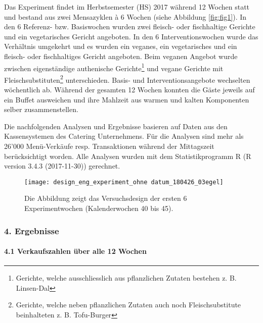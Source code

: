 \documentclass[12pt,ngerman,]{article}
\let\oldparagraph\paragraph
\renewcommand{\paragraph}[1]{\oldparagraph{#1}\mbox{}}
\let\rmarkdownfootnote\footnote%
\def\footnote{\protect\rmarkdownfootnote}
\begin{document}
\par

Das Experiment findet im Herbstsemester (HS) 2017 während 12 Wochen
statt und bestand aus zwei Mensazyklen à 6 Wochen (siehe Abbildung
\ref{fig:fig1}). In den 6 Referenz- bzw. Basiswochen wurden zwei
fleisch- oder fischhaltige Gerichte und ein vegetarisches Gericht
angeboten. In den 6 Interventionswochen wurde das Verhältnis umgekehrt
und es wurden ein veganes, ein vegetarisches und ein fleisch- oder
fischhaltiges Gericht angeboten. Beim veganen Angebot wurde zwischen
eigenständige authenische Gerichte\footnote{Gerichte, welche
  ausschliesslich aus pflanzlichen Zutaten bestehen z. B. Linsen-Dal}
und vegane Gerichte mit Fleischsubstituten\footnote{Gerichte, welche
  neben pflanzlichen Zutaten auch noch Fleischsubstitute beinhalteten z.
  B. Tofu-Burger} unterschieden. Basis- und Interventionsangebote
wechselten wöchentlich ab. Während der gesamten 12 Wochen konnten die
Gäste jeweils auf ein Buffet ausweichen und ihre Mahlzeit aus warmen und
kalten Komponenten selber zusammenstellen.

\par

Die nachfolgenden Analysen und Ergebnisse basieren auf Daten aus den
Kassensystemen des Catering Unternehmens. Für die Analysen sind mehr als
26'000 Menü-Verkäufe resp. Transaktionen während der Mittagszeit
berücksichtigt worden. Alle Analysen wurden mit dem Statistikprogramm R
(R version 3.4.3 (2017-11-30)) gerechnet.

\begin{figure}[H]

{\centering \texttt{[image: design\_eng\_experiment\_ohne datum\_180426\_03egel]} 

}

\caption{\label{fig:fig1} Die Abbildung zeigt das Versuchsdesign der ersten 6 Experimentwochen (Kalenderwochen 40 bis 45).}\label{fig:unnamed-chunk-1}
\end{figure}

\hypertarget{ergebnisse}{%
\subsubsection{4. Ergebnisse}\label{ergebnisse}}

\hypertarget{verkaufszahlen-uber-alle-12-wochen}{%
\paragraph{4.1 Verkaufszahlen über alle 12
Wochen}\label{verkaufszahlen-uber-alle-12-wochen}}
\end{document}
